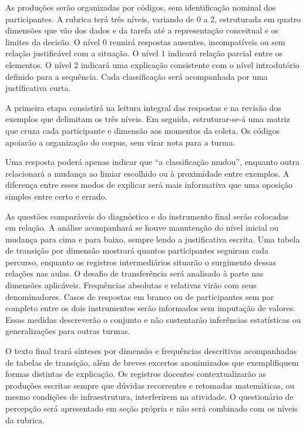 As produções serão organizadas por códigos, sem identificação nominal dos participantes. A rubrica terá três níveis, variando de 0 a 2, estruturada em quatro dimensões que vão dos dados e da tarefa até a representação conceitual e os limites da decisão. O nível 0 reunirá respostas ausentes, incompatíveis ou sem relação justificável com a situação. O nível 1 indicará relação parcial entre os elementos. O nível 2 indicará uma explicação consistente com o nível introdutório definido para a sequência. Cada classificação será acompanhada por uma justificativa curta.

A primeira etapa consistirá na leitura integral das respostas e na revisão dos exemplos que delimitam os três níveis. Em seguida, estruturar-se-á uma matriz que cruza cada participante e dimensão aos momentos da coleta. Os códigos apoiarão a organização do corpus, sem virar nota para a turma.

Uma resposta poderá apenas indicar que ``a classificação mudou'', enquanto outra relacionará a mudança ao limiar escolhido ou à proximidade entre exemplos. A diferença entre esses modos de explicar será mais informativa que uma oposição simples entre certo e errado.

As questões comparáveis do diagnóstico e do instrumento final serão colocadas em relação. A análise acompanhará se houve manutenção do nível inicial ou mudança para cima e para baixo, sempre lendo a justificativa escrita. Uma tabela de transição por dimensão mostrará quantos participantes seguiram cada percurso, enquanto os registros intermediários situarão o surgimento dessas relações nas aulas. O desafio de transferência será analisado à parte nas dimensões aplicáveis. Frequências absolutas e relativas virão com seus denominadores. Casos de respostas em branco ou de participantes sem par completo entre os dois instrumentos serão informados sem imputação de valores. Essas medidas descreverão o conjunto e não sustentarão inferências estatísticas ou generalizações para outras turmas.

O texto final trará sínteses por dimensão e frequências descritivas acompanhadas de tabelas de transição, além de breves excertos anonimizados que exemplifiquem formas distintas de explicação. Os registros docentes contextualizarão as produções escritas sempre que dúvidas recorrentes e retomadas matemáticas, ou mesmo condições de infraestrutura, interferirem na atividade. O questionário de percepção será apresentado em seção própria e não será combinado com os níveis da rubrica.

